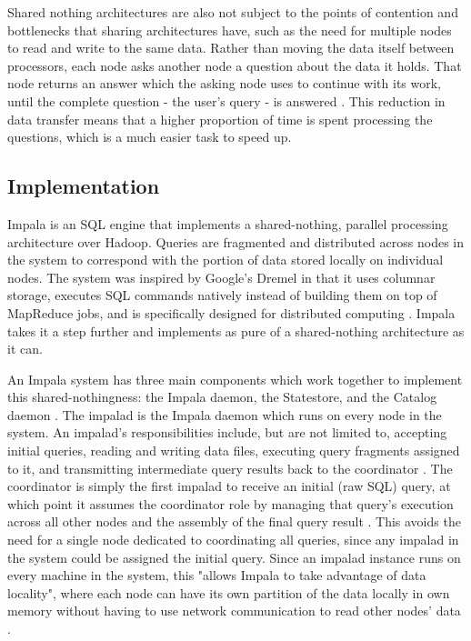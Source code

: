 \documentclass[onecolumn, draftclsnofoot,10pt, compsoc]{IEEEtran}
\begin{document}
Shared nothing architectures are also not subject to the points of contention and bottlenecks that sharing architectures have, such as the need for multiple nodes to read and write to the same data.
Rather than moving the data itself between processors, each node asks another node a question about the data it holds.
That node returns an answer which the asking node uses to continue with its work, until the complete question - the user’s query - is answered \cite{DeWittFuture}.
This reduction in data transfer means that a higher proportion of time is spent processing the questions, which is a much easier task to speed up.


	
    \subsection{Implementation}
    Impala is an SQL engine that implements a shared-nothing, parallel processing architecture over Hadoop.
    Queries are fragmented and distributed across nodes in the system to correspond with the portion of data stored locally on individual nodes.
    The system was inspired by Google’s Dremel in that it uses columnar storage, executes SQL commands natively instead of building them on top of MapReduce jobs, and is specifically designed for distributed computing \cite{SQLonHadoop} \cite{Dremel}.
    Impala takes it a step further and implements as pure of a shared-nothing architecture as it can.

An Impala system has three main components which work together to implement this shared-nothingness: the Impala daemon, the Statestore, and the Catalog daemon \cite{ImpalaGuide}. 
The impalad is the Impala daemon which runs on every node in the system.
An impalad's responsibilities include, but are not limited to, accepting initial queries, reading and writing data files, executing query fragments assigned to it, and transmitting intermediate query results back to the coordinator \cite{Impala} \cite{ImpalaGuide}.
The coordinator is simply the first impalad to receive an initial (raw SQL) query, at which point it assumes the coordinator role by managing that query’s execution across all other nodes and the assembly of the final query result \cite{Impala}. 
This avoids the need for a single node dedicated to coordinating all queries, since any impalad in the system could be assigned the initial query.
Since an impalad instance runs on every machine in the system, this "allows Impala to take advantage of data locality", where each node can have its own partition of the data locally in own memory without having to use network communication to read other nodes’ data \cite{Impala}.
\end{document}

